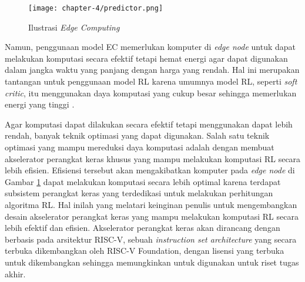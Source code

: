 \begin{figure}[h]
	\centering
	\texttt{[image: chapter-4/predictor.png]}
	\caption{Ilustrasi \textit{Edge Computing}}
	\label{fig:edge-computing}
\end{figure}

Namun, penggunaan model \ac{EC} memerlukan komputer di \textit{edge node} untuk dapat melakukan komputasi secara efektif tetapi hemat energi agar dapat digunakan dalam jangka waktu yang panjang dengan harga yang rendah. Hal ini merupakan tantangan untuk penggunaan model \ac{RL} karena umumnya model \ac{RL}, seperti \textit{soft critic}, itu menggunakan daya komputasi yang cukup besar sehingga memerlukan energi yang tinggi \parencite{wang2022efficient}.

Agar komputasi dapat dilakukan secara efektif tetapi menggunakan dapat lebih rendah, banyak teknik optimasi yang dapat digunakan. Salah satu teknik optimasi yang mampu mereduksi daya komputasi adalah dengan membuat akselerator perangkat keras khusus yang mampu melakukan komputasi RL secara lebih efisien. Efisiensi tersebut akan mengakibatkan komputer pada \textit{edge node} di Gambar \ref{fig:edge-computing} dapat melakukan komputasi secara lebih optimal karena terdapat subsistem perangkat keras yang terdedikasi untuk melakukan perhitungan algoritma RL. Hal inilah yang melatari keinginan penulis untuk mengembangkan desain akselerator perangkat keras yang mampu melakukan komputasi RL secara lebih efektif dan efisien. Akselerator perangkat keras akan dirancang dengan berbasis pada arsitektur RISC-V, sebuah \textit{instruction set architecture} yang secara terbuka dikembangkan oleh RISC-V Foundation, dengan lisensi yang terbuka untuk dikembangkan sehingga memungkinkan untuk digunakan untuk riset tugas akhir.
